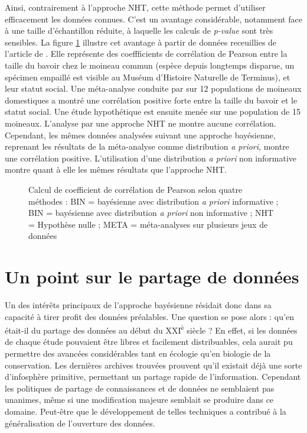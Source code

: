 \documentclass[11pt,twocolumn,twoside]{bopHomework}
\begin{document}
Ainsi, contrairement à l'approche NHT, cette méthode permet d'utiliser
efficacement les données connues.
C'est un avantage considérable, notamment face à une taille d'échantillon
réduite, à laquelle les calculs de \emph{p-value} sont très sensibles.
La figure \ref{fig:pearson} illustre cet avantage à partir de données
receuillies de l'article de \citet{garamszegi2009}.
Elle représente des coeffficients de corrélation de Pearson entre la taille du
bavoir chez le moineau commun (espèce depuis longtemps disparue, un spécimen
empaillé est visible au Muséum d'Histoire Naturelle de Terminus), et leur statut
social.
Une méta-analyse conduite par \citet{nakagawa2007} sur 12 populations de
moineaux domestiques a montré une corrélation positive forte entre la taille du
bavoir et le statut social.
Une étude hypothétique est ensuite menée sur une population de 15 moineaux.
L'analyse par une approche NHT ne montre aucune corrélation.
Cependant, les mêmes données analysées suivant une approche bayésienne,
reprenant les résultats de la méta-analyse comme distribution \emph{a priori},
montre une corrélation positive.
L'utilisation d'une distribution \emph{a priori} non informative montre quant à
elle les mêmes résultats que l'approche NHT.

\begin{figure}[t]
  {\graphfont\centering}
  \caption{Calcul de coefficient de corrélation de Pearson selon quatre méthodes
    : BIN = bayésienne avec distribution \textit{a priori} informative ;
    BIN = bayésienne avec distribution \textit{a priori} non informative ;
    NHT = Hypothèse nulle ;
    META = méta-analyses sur plusieurs jeux de données
  }
  \label{fig:pearson}
\end{figure}


\section{Un point sur le partage de données}

Un des intérêts principaux de l'approche bayésienne résidait donc dans sa
capacité à tirer profit des données préalables.
Une question se pose alors : qu'en était-il du partage des données au début du
XXI\textsuperscript{è} siècle ?
En effet, si les données de chaque étude pouvaient être libres et facilement
distribuables, cela aurait pu permettre des avancées considérables tant en
écologie qu'en biologie de la conservation.
Les dernières archives trouvées prouvent qu'il existait déjà une sorte
d'infosphère primitive, permettant un partage rapide de l'information.
Cependant les politiques de partage de connaissances et de données ne semblaient
pas unanimes, même si une modification majeure semblait se produire dans ce
domaine.
Peut-être que le développement de telles techniques a contribué à la
généralisation de l'ouverture des données.


\begin{scriptsize}
  
\end{scriptsize}
\end{document}
